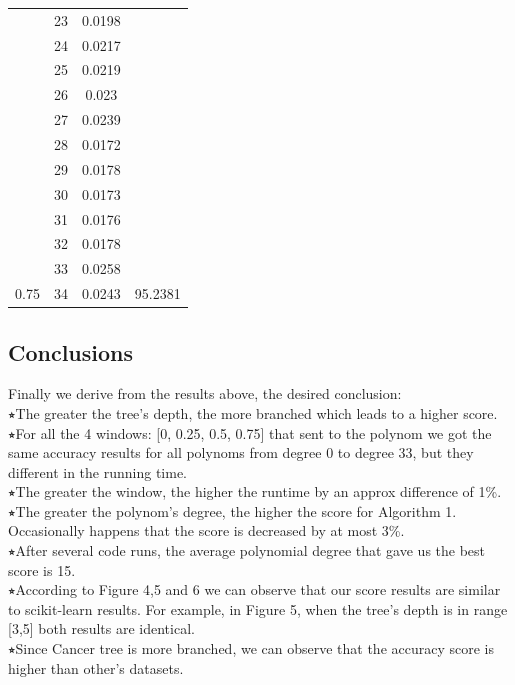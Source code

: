 \documentclass{article}
\begin{document}
\begin{multicols}{2}
\begin{table}[H]
\begin{tabular}{|c|c|c|c|}
 & 23 & 0.0198 & \cellcolor[HTML]{FFFFC7} \\ \cline{2-3}
 & 24 & 0.0217 & \cellcolor[HTML]{FFFFC7} \\ \cline{2-3}
 & 25 & 0.0219 & \cellcolor[HTML]{FFFFC7} \\ \cline{2-3}
 & 26 & 0.023 & \cellcolor[HTML]{FFFFC7} \\ \cline{2-3}
 & 27 & 0.0239 & \cellcolor[HTML]{FFFFC7} \\ \cline{2-3}
 & 28 & 0.0172 & \cellcolor[HTML]{FFFFC7} \\ \cline{2-3}
 & 29 & 0.0178 & \cellcolor[HTML]{FFFFC7} \\ \cline{2-3}
 & 30 & 0.0173 & \cellcolor[HTML]{FFFFC7} \\ \cline{2-3}
 & 31 & 0.0176 & \cellcolor[HTML]{FFFFC7} \\ \cline{2-3}
 & 32 & 0.0178 & \cellcolor[HTML]{FFFFC7} \\ \cline{2-3}
 & 33 & 0.0258 & \cellcolor[HTML]{FFFFC7} \\ \cline{2-3}
\multirow{-35}{*}{0.75} & 34 & 0.0243 & \multirow{-24}{*}{\cellcolor[HTML]{FFFFC7}95.2381} \\ \hline
\end{tabular}
\end{table}

\end{multicols}


\newpage
\subsection{Conclusions}
Finally we derive from the results above, the desired conclusion:\\
$\smwhitestar$The greater the tree’s depth, the more branched which leads to a higher score.\\
$\smwhitestar$For all the 4 windows: [0, 0.25, 0.5, 0.75] that sent to the polynom we got the same accuracy results for all polynoms from degree 0 to degree 33, but they different in the running time.\\
$\smwhitestar$The greater the window, the higher the runtime by an approx difference of 1\%. \\
$\smwhitestar$The greater the polynom’s degree, the higher the score for Algorithm 1.
Occasionally happens that the score is decreased by at most 3\%.\\
$\smwhitestar$After several code runs, the average polynomial degree that gave us the best score is 15.\\
$\smwhitestar$According to Figure 4,5 and 6 we can observe that our score results are similar to scikit-learn results. For example, in Figure 5, when the tree's depth is in range [3,5] both results are identical.\\
$\smwhitestar$Since Cancer tree is more branched, we can observe that the accuracy score is higher than other's datasets.
\end{document}
